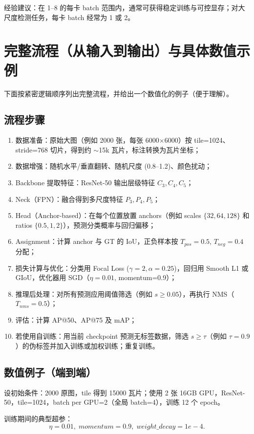 \documentclass[11pt,a4paper]{article}
\begin{document}
经验建议：在 1--8 的每卡 batch 范围内，通常可获得稳定训练与可控显存；对大尺度检测任务，每卡 batch 经常为 1 或 2。

\section{完整流程（从输入到输出）与具体数值示例}
下面按紧密逻辑顺序列出完整流程，并给出一个数值化的例子（便于理解）。

\subsection*{流程步骤}
\begin{enumerate}
  \item 数据准备：原始大图（例如 2000 张，每张 6000$\times$6000）按 tile=1024、stride=768 切片，得到约 $\sim$15k 瓦片，标注转换为瓦片坐标；
  \item 数据增强：随机水平/垂直翻转、随机尺度 (0.8--1.2)、颜色扰动；
  \item Backbone 提取特征：ResNet-50 输出层级特征 $C_3,C_4,C_5$；
  \item Neck（FPN）：融合得到多尺度特征 $P_3,P_4,P_5$；
  \item Head（Anchor-based）：在每个位置放置 anchors（例如 scales $\{32,64,128\}$ 和 ratios $\{0.5,1,2\}$），预测分类概率与回归偏移；
  \item Assignment：计算 anchor 与 GT 的 IoU，正负样本按 $T_{pos}=0.5$, $T_{neg}=0.4$ 分配；
  \item 损失计算与优化：分类用 Focal Loss ($\gamma=2,\alpha=0.25$)，回归用 Smooth L1 或 GIoU，优化器用 SGD（$\eta=0.01$, momentum=0.9）；
  \item 推理后处理：对所有预测应用阈值筛选（例如 $s\ge0.05$），再执行 NMS（$T_{nms}=0.5$）；
  \item 评估：计算 AP@50、AP@75 及 mAP；
  \item 若使用自训练：用当前 checkpoint 预测无标签数据，筛选 $s\ge\tau$（例如 $\tau=0.9$）的伪标签并加入训练或加权训练；重复训练。
\end{enumerate}

\subsection*{数值例子（端到端）}
设初始条件：2000 原图，tile 得到 15000 瓦片；使用 2 张 16GB GPU，ResNet-50，tile=1024，batch per GPU=2（全局 batch=4），训练 12 个 epoch。

训练期间的典型超参：\[\eta=0.01,\; momentum=0.9,\; weight\_decay=1e-4.\]
\end{document}
